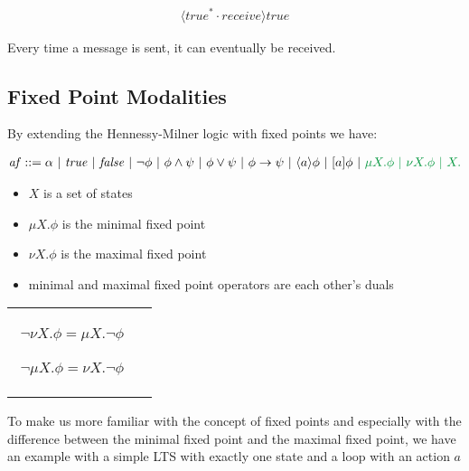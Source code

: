 \documentclass{clseminar}
\begin{document}
  \begin{align*}
    [\mathit{true}^*\cdot \mathit{send}]\langle \mathit{true}^* \cdot \mathit{receive} \rangle \mathit{true}
  \end{align*}

  Every time a message is sent, it can eventually be received.

  \subsection{Fixed Point Modalities}

  By extending the Hennessy-Milner logic with fixed points we have:

  \begin{align*}
    \mathit{af} ::= \alpha\ |\ \mathit{true}\ |\ \mathit{false}\ |\ \neg \phi\ |\ \phi \land \psi\ |\ \phi \lor \psi\ |\ \phi \to \psi\ |\ \langle a \rangle \phi \ |\ [a]\phi\ |\ \color{green} \mu X. \phi \ |\ \nu X. \phi \ |\ X.
  \end{align*}

  \begin{itemize}
    \item $X$ is a set of states
    \item $\mu X. \phi$ is the minimal fixed point
    \item $\nu X. \phi$ is the maximal fixed point
    \item minimal and maximal fixed point operators are each other's duals
  \end{itemize}
  \begin{tabular}{cc}
    \begin{minipage}{.47\linewidth}
      \begin{align*}
        \neg \nu X. \phi = \mu X. \neg \phi
      \end{align*}
    \end{minipage}
    \begin{minipage}{.47\linewidth}
      \begin{align*}
        \neg \mu X. \phi = \nu X. \neg \phi
      \end{align*}
    \end{minipage}
  \end{tabular}

  To make us more familiar with the concept of fixed points and especially with the difference between the minimal fixed point and the maximal fixed point, we have an example with a simple LTS with exactly one state and a loop with an action $a$ \\
\end{document}
